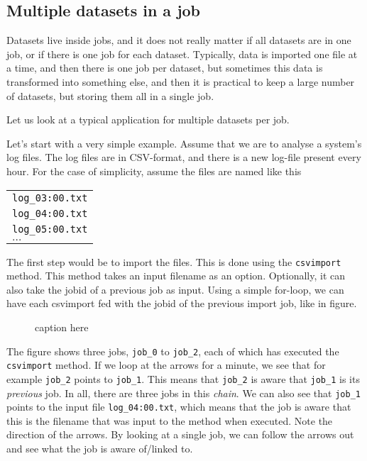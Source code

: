 \documentclass[a4paper]{article}
\begin{document}
\subsection{Multiple datasets in a job}
Datasets live inside jobs, and it does not really matter if all
datasets are in one job, or if there is one job for each dataset.
Typically, data is imported one file at a time, and then there is one
job per dataset, but sometimes this data is transformed into something
else, and then it is practical to keep a large number of datasets, but
storing them all in a single job.

Let us look at a typical application for multiple datasets per job.








\clearpage


Let's start with a very simple example.  Assume that we are to analyse
a system's log files.  The log files are in CSV-format, and there is a
new log-file present every hour.  For the case of simplicity, assume
the files are named like this

\begin{tabular}{l}
  \texttt{log\_03:00.txt}\\
  \texttt{log\_04:00.txt}\\
  \texttt{log\_05:00.txt}\\
  $\dots$
\end{tabular}

\noindent The first step would be to import the files.  This is done
using the \texttt{csvimport} method.  This method takes an input
filename as an option.  Optionally, it can also take the jobid of a
previous job as input.  Using a simple for-loop, we can have each
csvimport fed with the jobid of the previous import job, like in
figure.
\begin{figure}[h!]
  \begin{center}
    
    \caption{caption here}
    \label{figure:example}
  \end{center}
\end{figure}
The figure shows three jobs, \texttt{job\_0} to \texttt{job\_2}, each
of which has executed the \texttt{csvimport} method.  If we loop at
the arrows for a minute, we see that for example \texttt{job\_2}
points to \texttt{job\_1}.  This means that \texttt{job\_2} is aware
that \texttt{job\_1} is its \textsl{previous} job.  In all, there are
three jobs in this \textsl{chain}.  We can also see that
\texttt{job\_1} points to the input file \texttt{log\_04:00.txt},
which means that the job is aware that this is the filename that was
input to the method when executed.  Note the direction of the arrows.
By looking at a single job, we can follow the arrows out and see what
the job is aware of/linked to.
\end{document}
